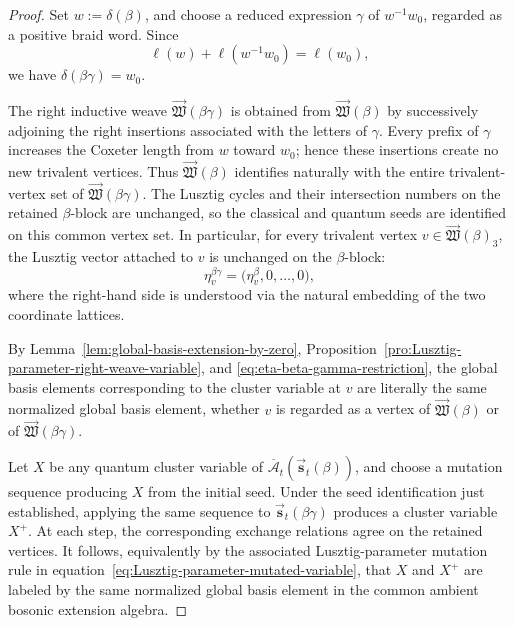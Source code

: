 \documentclass[12pt, reqno]{amsart}
\theoremstyle{plain}
\theoremstyle{definition}
\numberwithin{equation}{section}
\begin{document}
\begin{proof}
Set $w:=\delta(\beta)$, and choose a reduced expression $\gamma$ of
$w^{-1}w_0$, regarded as a positive braid word. Since
\begin{equation*}
    \ell(w)+\ell(w^{-1}w_0)=\ell(w_0),
\end{equation*}
we have $\delta(\beta\gamma)=w_0$.

The right inductive weave
$\overrightarrow{\mathfrak W}(\beta\gamma)$ is obtained from
$\overrightarrow{\mathfrak W}(\beta)$ by successively adjoining the
right insertions associated with the letters of $\gamma$. Every prefix of
\(\gamma\) increases the Coxeter length from \(w\) toward \(w_0\); hence
these insertions create no new trivalent vertices. Thus
$\overrightarrow{\mathfrak W}(\beta)$ identifies naturally with the
entire trivalent-vertex set of
$\overrightarrow{\mathfrak W}(\beta\gamma)$. The Lusztig cycles and their
intersection numbers on the retained \(\beta\)-block are unchanged, so the
classical and quantum seeds are identified on this common vertex set. In
particular, for every
trivalent vertex
$v\in\overrightarrow{\mathfrak W}(\beta)_3$, the Lusztig vector
attached to $v$ is unchanged on the $\beta$-block:
\begin{equation}\label{eq:eta-beta-gamma-restriction}
    \eta_v^{\beta\gamma}
    =
    \bigl(\eta_v^\beta,0,\ldots,0\bigr),
\end{equation}
where the right-hand side is understood via the natural embedding of the
two coordinate lattices.

By Lemma~\ref{lem:global-basis-extension-by-zero},
Proposition~\ref{pro:Lusztig-parameter-right-weave-variable}, and
\eqref{eq:eta-beta-gamma-restriction}, the global basis elements corresponding to the cluster
variable at \(v\) are literally the same normalized global basis element,
whether \(v\) is regarded as a vertex of
\(\overrightarrow{\mathfrak W}(\beta)\) or of
\(\overrightarrow{\mathfrak W}(\beta\gamma)\). 


Let $X$ be any quantum cluster variable of
$\overline{\mathcal A}_t(\overrightarrow{\mathbf s}_t(\beta))$, and choose a
mutation sequence producing $X$ from the initial seed. Under the seed
identification just established, applying the
same sequence to
$\overrightarrow{\mathbf s}_t(\beta\gamma)$ produces a cluster
variable $X^+$. At each
step, the corresponding exchange relations agree on the retained
vertices. It follows, equivalently by the associated Lusztig-parameter mutation rule in equation~\eqref{eq:Lusztig-parameter-mutated-variable}, that $X$ and
$X^+$ are labeled by the same normalized global basis element in the
common ambient bosonic extension algebra.


\end{proof}
\end{document}
